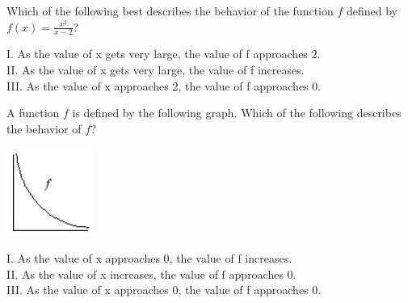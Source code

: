 \documentclass{ximera}
\newcommand{\recommendation}[1]{}
\newcommand{\PCA}[1]{}
\begin{document}



\begin{problem}
  \recommendation{Elizabeth}
  \PCA{\#25}

  Which of the following best describes the behavior of the function $f$
  defined by $f(x)=\frac{x^2}{x-2}$?

I. As the value of x gets very large, the value of f approaches 2.\\
II.  As the value of x gets very large, the value of f increases.\\
III.  As the value of x approaches 2, the value of f approaches 0.
  \begin{multipleChoice}
  \end{multipleChoice}
\end{problem}

\begin{problem}
\recommendation{Elizabeth}
\PCA{\#24}

A function $f$ is defined by the following graph.  Which of the
following describes the behavior of $f$?
\begin{image}
\includegraphics[scale = 1]{f.jpg}
\end{image}
 I.  As the value of x approaches 0, the value of f increases.\\
 II.  As the value of x increases, the value of f approaches 0.\\
 III.  As the value of x approaches 0, the value of f approaches 0.
  \begin{multipleChoice}
  \end{multipleChoice}
\end{problem}
\end{document}
